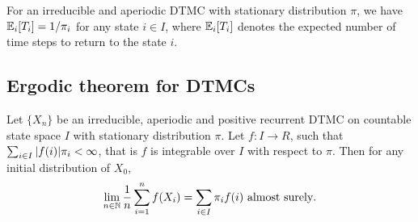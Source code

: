 \documentclass[a4paper,10pt,english]{article}
\begin{document}
\begin{cor} For an irreducible and aperiodic DTMC with stationary distribution $\pi$, we have $\mathbb{E}_i[T_i] = 1/\pi_i$ for any state $i \in I$, where $\mathbb{E}_i[T_i]$ denotes the expected number of time steps to return to the state $i$.
\end{cor}

\subsection{Ergodic theorem for DTMCs}
\begin{prop} Let $\{X_n\}$ be an irreducible, aperiodic and positive recurrent DTMC on countable state space $I$ with stationary distribution $\pi$. 
Let $f : I \to R$, such that $\sum_{i \in I} \arrowvert f(i) \arrowvert \pi_i < \infty$, that is $f$ is integrable over $I$ with respect to $\pi$.  
Then for any initial distribution of $X_0$, 
\begin{align*}
\lim_{n\in \mathbb{N}}\frac{1}{n} \sum_{i=1}^{n} f(X_i) = \sum_{i \in I} \pi_if(i) \text{ almost surely}.
\end{align*}
\end{prop}
\end{document}
